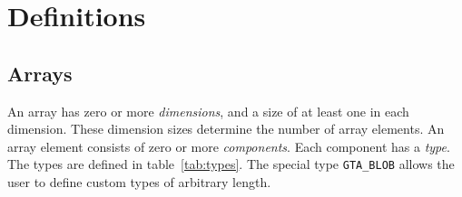 \documentclass[a4paper,11pt]{article}
\newcommand{\code}[1]{\texttt{#1}}
\begin{document}
\section{Definitions}

\subsection{Arrays}

An array has zero or more \emph{dimensions}, and a size of at least one in each
dimension. These dimension sizes determine the number of array elements.
An array element consists of zero or more \emph{components}.
Each component has a \emph{type}. The types are defined in table~\ref{tab:types}.
The special type \code{GTA\_BLOB} allows the user to define custom types
of arbitrary length.
\end{document}
